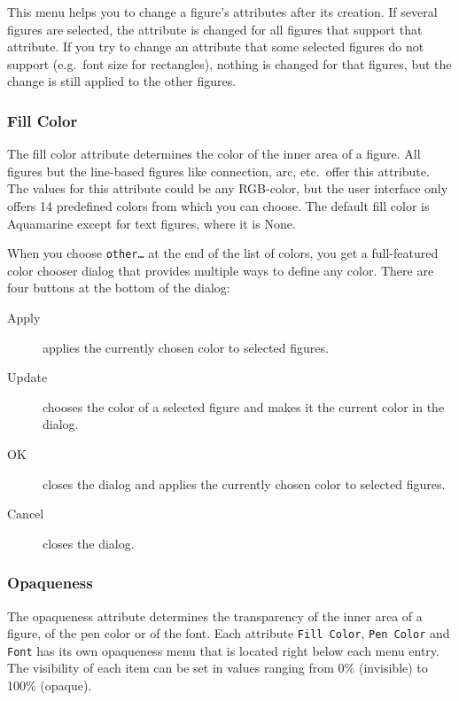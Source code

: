 This menu helps you to change a figure's attributes after its
creation. If several figures are selected, the attribute is
changed for all figures that support that attribute.
If you try to change an attribute that some selected figures do
not support (e.g.\ font size for rectangles), nothing
is changed for that figures, but the change is still applied
to the other figures.

\subsubsection{Fill Color}

The fill color attribute determines the color of the inner
area of a figure. All figures but the line-based figures like
connection, arc, etc.\ offer this attribute.
The values for this attribute could be any RGB-color, but the
user interface only offers 14 predefined colors from which
you can choose. The default fill color is Aquamarine except for
text figures, where it is None.

When you choose \texttt{other\dots} at the end of the list of colors, you
get a full-featured color chooser dialog that provides multiple ways to
define any color.
There are four buttons at the bottom of the dialog:

\begin{description}
\item[Apply] applies the currently chosen color to selected figures.
\item[Update] chooses the color of a selected figure and makes it the
  current color in the dialog.
\item[OK] closes the dialog and applies the currently chosen color to
  selected figures.
\item[Cancel] closes the dialog.
\end{description}

\subsubsection{Opaqueness}
The opaqueness attribute determines the transparency of the inner area of a figure, 
of the pen color or of the font. 
Each attribute \texttt{Fill Color}, \texttt{Pen Color} and \texttt{Font} has its own 
opaqueness menu that is located right below each menu entry.
The visibility of each item can be set in values ranging from 0\% (invisible) 
to 100\% (opaque).%

